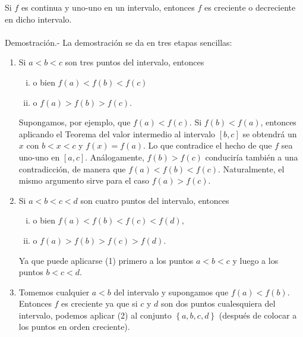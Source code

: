 \begin{teo}
    Si $f$ es continua y uno-uno en un intervalo, entonces $f$ es creciente o decreciente en dicho intervalo.\\\\
	Demostración.-\; La demostración se da en tres etapas sencillas:
	\begin{enumerate}[(1)]
	    \item Si $a<b<c$ son tres puntos del intervalo, entonces
		\begin{enumerate}[(i)]
		    \item o bien $f(a)<f(b)<f(c)$
		    \item o $f(a)>f(b)>f(c)$.
		\end{enumerate}
		Supongamos, por ejemplo, que $f(a)<f(c)$. Si $f(b)<f(a)$, entonces aplicando el Teorema del valor intermedio al intervalo $[b,c]$ se obtendrá un $x$ con $b<x<c$ y $f(x)=f(a)$. Lo que contradice el hecho de que $f$ sea uno-uno en $[a,c]$. Análogamente, $f(b)>f(c)$ conduciría también a una contradicción, de manera que $f(a)<f(b)<f(c)$. Naturalmente, el mismo argumento sirve para el caso $f(a)>f(c).$
	    \item Si $a<b<c<d$ son cuatro puntos del intervalo, entonces
		\begin{enumerate}[(i)]
		    \item o bien $f(a)<f(b)<f(c)<f(d),$
		    \item o $f(a)>f(b)>f(c)>f(d)$.
		\end{enumerate}
		Ya que puede aplicarse (1) primero a los puntos $a<b<c$ y luego a los puntos $b<c<d.$
	    \item Tomemos cualquier $a<b$ del intervalo y supongamos que $f(a)<f(b)$. Entonces $f$ es creciente ya que si $c$ y $d$ son dos puntos cualesquiera del intervalo, podemos aplicar (2) al conjunto $\left\{a,b,c,d\right\}$ (después de colocar a los puntos en orden creciente).
	\end{enumerate}
\end{teo}

